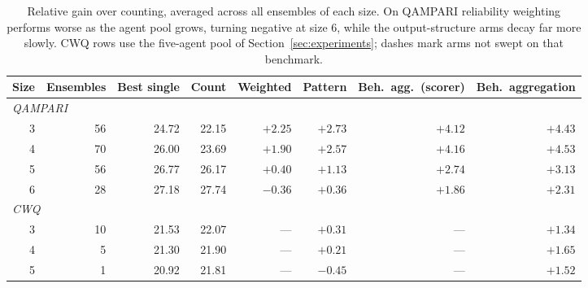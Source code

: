 \documentclass[11pt]{article}
\begin{document}
\begin{table}[t]
  \caption{Relative gain over counting, averaged across all ensembles of each size. On QAMPARI reliability weighting performs worse as the agent pool grows, turning negative at size 6, while the output-structure arms decay far more slowly. CWQ rows use the five-agent pool of Section~\ref{sec:experiments}; dashes mark arms not swept on that benchmark.}
  \label{tab:ens-gain}
  \centering
  \begin{tabular}{rrrrrrrr}
    \toprule
    Size & Ensembles & Best single & Count & Weighted & Pattern & Beh.\ agg.\ (scorer) & Beh.\ aggregation \\
    \midrule
    \multicolumn{8}{l}{\emph{QAMPARI}} \\
    3 & 56 & 24.72 & 22.15 & $+2.25$ & $+2.73$ & $+4.12$ & $\mathbf{+4.43}$ \\
    4 & 70 & 26.00 & 23.69 & $+1.90$ & $+2.57$ & $+4.16$ & $\mathbf{+4.53}$ \\
    5 & 56 & 26.77 & 26.17 & $+0.40$ & $+1.13$ & $+2.74$ & $\mathbf{+3.13}$ \\
    6 & 28 & 27.18 & 27.74 & $-0.36$ & $+0.36$ & $+1.86$ & $\mathbf{+2.31}$ \\
    \midrule
    \multicolumn{8}{l}{\emph{CWQ}} \\
    3 & 10 & 21.53 & 22.07 & --- & $+0.31$ & --- & $\mathbf{+1.34}$ \\
    4 &  5 & 21.30 & 21.90 & --- & $+0.21$ & --- & $\mathbf{+1.65}$ \\
    5 &  1 & 20.92 & 21.81 & --- & $-0.45$ & --- & $\mathbf{+1.52}$ \\
    \bottomrule
  \end{tabular}
\end{table}
\end{document}

